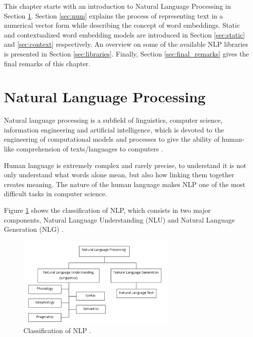 This chapter starts with an introduction to Natural Language Processing in Section \ref{sec:nlp}. Section \ref{sec:num} explains the process of representing text in a numerical vector form while describing the concept of word embeddings. Static and contextualized word embedding models are introduced in Section \ref{sec:static} and \ref{sec:context} respectively. An overview on some of the available NLP libraries is presented in Section \ref{sec:libraries}. Finally, Section \ref{sec:final_remarks} gives the final remarks of this chapter.

\newpage
\section{Natural Language Processing}
\label{sec:nlp}

Natural language processing is a subfield of linguistics, computer science, information engineering and artificial intelligence, which is devoted to the engineering of computational models and processes to give the ability of human-like comprehension of texts/languages to computers \cite{Khurana2018}. 

Human language is extremely complex and rarely precise, to understand it is not only understand what words alone mean, but also how linking them together creates meaning. The nature of the human language makes NLP one of the most difficult tasks in computer science. 

Figure \ref{fig:nlp_class} shows the classification of NLP, which consists in two major components, Natural Language Understanding (NLU) and Natural Language Generation (NLG) \cite{Khurana2018}.  \par




\begin{figure}[htb]
    \centering
    \captionsetup{justification=centering}
    \includegraphics[width=0.7\textwidth]{Sections/3StateOfTheArt/3_images/NLP_diagram.png}
    \caption[Classification of NLP.]{Classification of NLP \cite{Khurana2018}.}  
    \label{fig:nlp_class} 
\end{figure}

